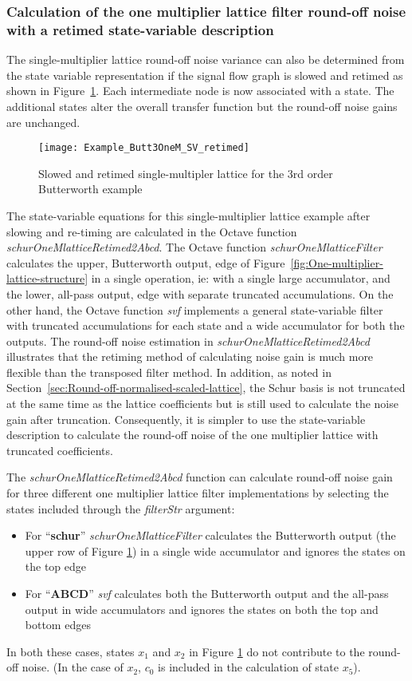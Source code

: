 \documentclass[a4paper,twoside,10pt,english]{report}
\begin{document}
\subsubsection{Calculation of the one multiplier lattice filter round-off noise with a retimed state-variable description}
The single-multiplier lattice round-off noise variance can also be determined
from the state variable representation if the signal flow graph is slowed
and retimed as shown in Figure~\ref{fig:Slowed-and-retimed-3rdButt-Single-Mult}.
Each intermediate node is now associated with a state. The additional
states alter the overall transfer function but the round-off noise
gains are unchanged. 
\begin{figure}[!htbp]
\centering
\texttt{[image: Example\_Butt3OneM\_SV\_retimed]}
\caption{Slowed and retimed single-multipler lattice for the 3rd order Butterworth example}
\label{fig:Slowed-and-retimed-3rdButt-Single-Mult}
\end{figure}
The state-variable equations for this single-multiplier lattice example
after slowing and re-timing are calculated in the Octave function 
\emph{schurOneMlatticeRetimed2Abcd}. The Octave function 
\emph{schurOneMlatticeFilter} calculates the upper, Butterworth output, edge of 
Figure~\ref{fig:One-multiplier-lattice-structure} in a single operation,
ie: with a single large accumulator, and the lower, all-pass output, edge
with separate truncated accumulations. On the other hand, the Octave function
\emph{svf} implements a general
state-variable filter with truncated accumulations for each state and a wide
accumulator for both the outputs. The round-off noise estimation in 
\emph{schurOneMlatticeRetimed2Abcd} illustrates that the retiming method of 
calculating noise gain is much more flexible than the transposed filter 
method. In addition, as noted in 
Section~\ref{sec:Round-off-normalised-scaled-lattice}, the Schur basis is not 
truncated at the same time as the lattice coefficients but is still used
to calculate the noise gain after truncation. Consequently, it is 
simpler to use the state-variable description to calculate the round-off noise
of the one multiplier lattice with truncated coefficients. 

The \emph{schurOneMlatticeRetimed2Abcd} function can calculate round-off 
noise gain for three different one multiplier lattice filter implementations by 
selecting the states included through the \emph{filterStr} argument:
\begin{itemize}
\item For ``\textbf{schur}'' \emph{schurOneMlatticeFilter} calculates the 
Butterworth  output (the upper row of Figure 
\ref{fig:Slowed-and-retimed-3rdButt-Single-Mult}) in a single
wide accumulator and ignores the states on the top edge 
\item For ``\textbf{ABCD}'' \emph{svf} calculates both the Butterworth output 
and the all-pass output in wide accumulators and ignores the states on both
the top and bottom edges
\end{itemize}
In both these cases, states $x_{1}$ and $x_{2}$ in Figure 
\ref{fig:Slowed-and-retimed-3rdButt-Single-Mult} do not contribute to the
round-off noise. (In the case of $x_{2}$, $c_{0}$ is included in the 
calculation of state $x_{5}$).
\end{document}
